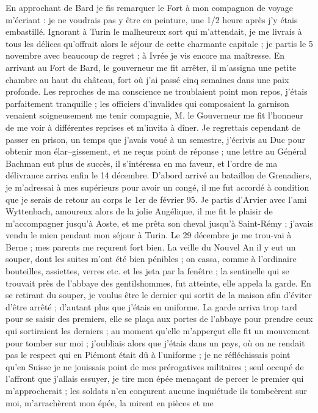 \documentclass[12pt]{article}
\begin{document}
 En approchant de Bard je fis remarquer le Fort à
mon compagnon de voyage m’écriant : je ne voudrais pas y être en peinture, une 1/2 heure après j’y
étais embastillé. Ignorant à Turin le malheureux sort qui m’attendait, je me livrais à tous les
délices qu’offrait alors le séjour de cette charmante capitale ; je partis le 5 novembre avec
beaucoup de regret ; à Ivrée je vis encore ma maîtresse. En arrivant au Fort de Bard, le gouverneur
me fit arrêter, il m’assigna une petite chambre au haut du château, fort où j’ai passé cinq semaines
dans une paix profonde. Les reproches de ma conscience ne troublaient point mon repos, j’étais
parfaitement tranquille ; les officiers d’invalides qui composaient la garnison venaient
soigneusement me tenir compagnie, M. le Gouverneur me fit l’honneur de me voir à différentes
reprises et m’invita à dîner. Je regrettais cependant de passer en prison, un temps que j’avais voué
à un semestre, j’écrivis au Duc pour obtenir mon élar–gissement, et ne reçus point de réponse ; une
lettre au Général Bachman eut plus de succès, il s’intéressa en ma faveur, et l’ordre de ma
délivrance arriva enfin le 14 décembre. D’abord arrivé au bataillon de Grenadiers, je m’adressai à
mes supérieurs pour avoir un congé, il me fut accordé à condition que je serais de retour au corps
le 1er de février 95. Je partis d’Arvier avec l’ami Wyttenbach, amoureux alors de la jolie
Angélique, il me fit le plaisir de m’accompagner jusqu’à Aoste, et me prêta son cheval jusqu’à
Saint-Rémy ; j’avais vendu le mien pendant mon séjour à Turin. Le 29 décembre je me trou-vai à Berne
; mes parents me reçurent fort bien. La veille du Nouvel An il y eut un souper, dont les suites
m’ont été bien pénibles ; on cassa, comme à l’ordinaire bouteilles, assiettes, verres etc. et les
jeta par la fenêtre ; la sentinelle qui se trouvait près de l’abbaye des gentilshommes, fut
atteinte, elle appela la garde. En se retirant du souper, je voulus être le dernier qui sortit de la
maison afin d’éviter d’être arrêté ; d’autant plus que j’étais en uniforme. La garde arriva trop
tard pour se saisir des premiers, elle se plaça aux portes de l’abbaye pour prendre ceux qui
sortiraient les derniers ; au moment qu’elle m’apperçut elle fit un mouvement pour tomber sur moi ;
j’oubliais alors que j’étais dans un pays, où on ne rendait pas le respect qui en Piémont était dû à
l’uniforme ; je ne réfléchissais point qu’en Suisse je ne jouissais point de mes prérogatives
militaires ; seul occupé de l’affront que j’allais essuyer, je tire mon épée menaçant de percer le
premier qui m’approcherait ; les soldats n’en conçurent aucune inquiétude ils tombeèrent sur moi,
m’arrachèrent mon épée, la mirent en pièces et me
\end{document}
